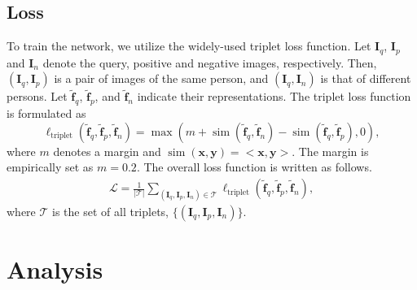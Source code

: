 \documentclass{llncs}
\begin{document}
\subsection{Loss}
To train the network, we utilize the widely-used triplet loss function.
Let $\mathbf{I}_q$, $\mathbf{I}_p$ and $\mathbf{I}_n$ denote the query, positive and negative images, respectively. Then, $(\mathbf{I}_q, \mathbf{I}_p)$ is a pair of images of the same person, and $(\mathbf{I}_q, \mathbf{I}_n)$ is that of different persons.
Let $\tilde{\mathbf{f}}_q$, $\tilde{\mathbf{f}}_p$, and $\tilde{\mathbf{f}}_n$ indicate their representations. The triplet loss function is formulated as
\begin{equation}
\label{eq:triplet_loss}
\ell_{\operatorname{triplet}}(\tilde{\mathbf{f}}_q,\tilde{\mathbf{f}}_p,\tilde{\mathbf{f}}_n)
=  \max(m + \operatorname{sim}(\tilde{\mathbf{f}}_q,\tilde{\mathbf{f}}_n) - \operatorname{sim}(\tilde{\mathbf{f}}_q,\tilde{\mathbf{f}}_p), 0),
\end{equation}
where $m$ denotes a margin and
$\operatorname{sim}(\mathbf{x}, \mathbf{y}) = <\mathbf{x}, \mathbf{y}>$. 
The margin is empirically set as
$m = 0.2$.
The overall loss function is written as follows.
\begin{align}
\mathcal{L} = \frac{1}{|\mathcal{T}|}\sum\nolimits_{(\mathbf{I}_q, \mathbf{I}_p, \mathbf{I}_n) \in
\mathcal{T}}\ell_{\operatorname{triplet}}(\tilde{\mathbf{f}}_q,\tilde{\mathbf{f}}_p,\tilde{\mathbf{f}}_n),
\label{eqn:overalllossfunction}
\end{align}
where $\mathcal{T}$ is the set
of all triplets, $\{(\mathbf{I}_q, \mathbf{I}_p, \mathbf{I}_n)\}$.


\section{Analysis}
\label{section:analysis}
\end{document}
